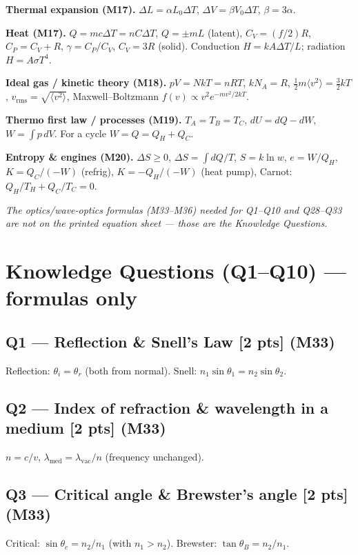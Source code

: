 \documentclass[11pt]{article}
\begin{document}
\textbf{Thermal expansion (M17).} \(\Delta L=\alpha L_0 \Delta T\), \(\Delta V=\beta V_0\Delta T\), \(\beta=3\alpha\).

\textbf{Heat (M17).} \(Q=mc\Delta T = nC\Delta T\), \(Q=\pm m L\) (latent), \(C_V=(f/2)R\), \(C_P=C_V+R\), \(\gamma=C_P/C_V\), \(C_V=3R\) (solid). Conduction \(H=kA\Delta T/L\); radiation \(H=A\sigma T^4\).

\textbf{Ideal gas / kinetic theory (M18).} \(pV=NkT=nRT\), \(kN_A=R\), \(\tfrac12 m\langle v^2\rangle = \tfrac32 kT\), \(v_{\mathrm{rms}}=\sqrt{\langle v^2\rangle}\), Maxwell--Boltzmann \(f(v)\propto v^2 e^{-mv^2/2kT}\).

\textbf{Thermo first law / processes (M19).} \(T_A=T_B=T_C\), \(dU=dQ-dW\), \(W=\int p\,dV\). For a cycle \(W=Q=Q_H+Q_C\).

\textbf{Entropy \& engines (M20).} \(\Delta S \ge 0\), \(\Delta S=\int dQ/T\), \(S=k\ln w\), \(e=W/Q_H\), \(K=Q_C/(-W)\) (refrig), \(K=-Q_H/(-W)\) (heat pump), Carnot: \(Q_H/T_H + Q_C/T_C = 0\).

\noindent\emph{The optics/wave-optics formulas (M33--M36) needed for Q1--Q10 and Q28--Q33 are not on the printed equation sheet --- those are the Knowledge Questions.}

\section*{Knowledge Questions (Q1--Q10) --- formulas only}

\subsection*{Q1 --- Reflection \& Snell's Law [2 pts] (M33)}
Reflection: \(\theta_i = \theta_r\) (both from normal). \quad Snell: \(n_1\sin\theta_1 = n_2\sin\theta_2\).

\subsection*{Q2 --- Index of refraction \& wavelength in a medium [2 pts] (M33)}
\(n = c/v\), \quad \(\lambda_{\mathrm{med}} = \lambda_{\mathrm{vac}}/n\) (frequency unchanged).

\subsection*{Q3 --- Critical angle \& Brewster's angle [2 pts] (M33)}
Critical: \(\sin\theta_c = n_2/n_1\) (with \(n_1>n_2\)). \quad Brewster: \(\tan\theta_B = n_2/n_1\).
\end{document}
